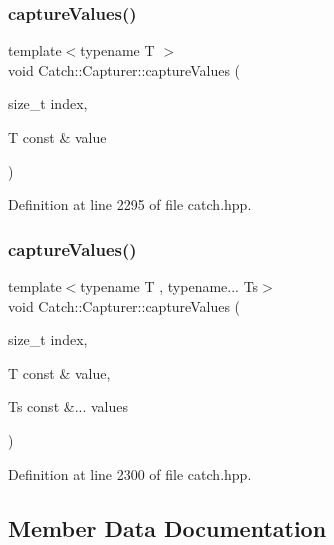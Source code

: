 \mbox{\label{class_catch_1_1_capturer_a60d08e6db2e54740bb2298bbbec3bc0b}} 
\subsubsection{captureValues()\hspace{0.1cm}{\footnotesize\ttfamily [1/2]}}
{\footnotesize\ttfamily template$<$typename T $>$ \\
void Catch\+::\+Capturer\+::capture\+Values (\begin{DoxyParamCaption}\item[{size\+\_\+t}]{index,  }\item[{T const \&}]{value }\end{DoxyParamCaption})\hspace{0.3cm}{\ttfamily [inline]}}



Definition at line 2295 of file catch.\+hpp.

\mbox{\label{class_catch_1_1_capturer_a76f2a097cfeb3042688300b81eb9bcbc}} 
\subsubsection{captureValues()\hspace{0.1cm}{\footnotesize\ttfamily [2/2]}}
{\footnotesize\ttfamily template$<$typename T , typename... Ts$>$ \\
void Catch\+::\+Capturer\+::capture\+Values (\begin{DoxyParamCaption}\item[{size\+\_\+t}]{index,  }\item[{T const \&}]{value,  }\item[{Ts const \&...}]{values }\end{DoxyParamCaption})\hspace{0.3cm}{\ttfamily [inline]}}



Definition at line 2300 of file catch.\+hpp.



\subsection{Member Data Documentation}
\mbox{\label{class_catch_1_1_capturer_a1c3bea0fde97a7663ece4b81187fa9ed}} 
